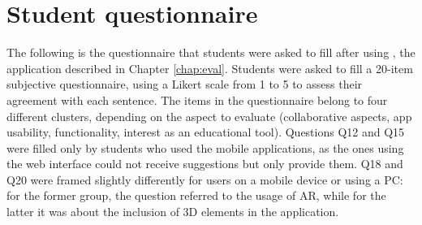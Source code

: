\chapter{Student questionnaire} \label{append:stuqu}
The following is the questionnaire that students were asked to fill after using \appname{}, the application described in Chapter \ref{chap:eval}. Students were asked to fill a 20-item subjective questionnaire, using a Likert scale from 1 to 5 to assess their agreement with each sentence. The items in the questionnaire belong to four different clusters, depending on the aspect to evaluate (collaborative aspects, app usability, functionality, interest as an educational tool). Questions Q12 and Q15 were filled only by students who used the mobile applications, as the ones using the web interface could not receive suggestions but only provide them. Q18 and Q20 were framed slightly differently for users on a mobile device or using a PC: for the former group, the question referred to the usage of AR, while for the latter it was about the inclusion of 3D elements in the application. 


